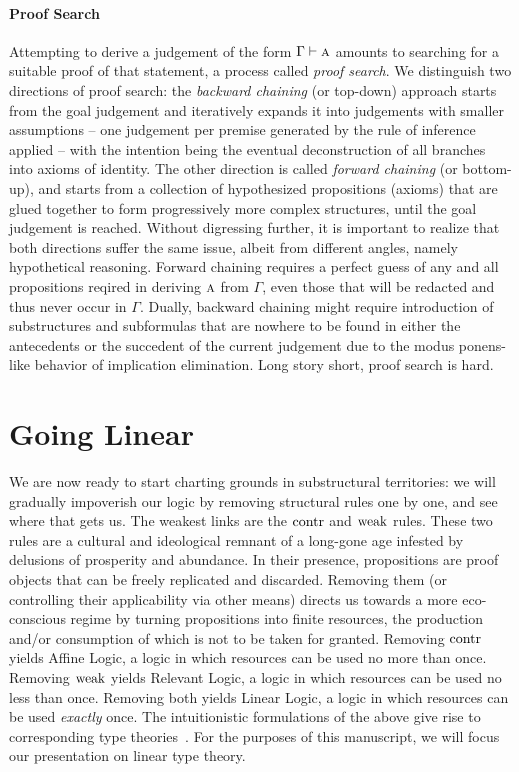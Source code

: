 \paragraph{Proof Search}
Attempting to derive a judgement of the form $\Gamma \vdash \smallprop{A}$ amounts to searching for a suitable proof of that statement, a process called \textit{proof search}.
We distinguish two directions of proof search: the \textit{backward chaining} (or top-down) approach starts from the goal judgement and iteratively expands it into judgements with smaller assumptions -- one judgement per premise generated by the rule of inference applied -- with the intention being the eventual deconstruction of all branches into axioms of identity.
The other direction is called \textit{forward chaining} (or bottom-up), and starts from a collection of hypothesized propositions (axioms) that are glued together to form progressively more complex structures, until the goal judgement is reached.
Without digressing further, it is important to realize that both directions suffer the same issue, albeit from different angles, namely hypothetical reasoning.
Forward chaining requires a perfect guess of any and all propositions reqired in deriving $\smallprop{A}$ from $\Gamma$, even those that will be redacted and thus never occur in $\Gamma$.
Dually, backward chaining might require introduction of substructures and subformulas that are nowhere to be found in either the antecedents or the succedent of the current judgement due to the modus ponens-like behavior of implication elimination.
Long story short, proof search is hard.

\section{Going Linear}
We are now ready to start charting grounds in substructural territories: we will gradually impoverish our logic by removing structural rules one by one, and see where that gets us. 
The weakest links are the $\mathrm{contr}{}$ and $\mathrm{weak}{}$ rules.
These two rules are a cultural and ideological remnant of a long-gone age infested by delusions of prosperity and abundance.
In their presence, propositions are proof objects that can be freely replicated and discarded.
Removing them (or controlling their applicability via other means) directs us towards a more eco-conscious regime by turning propositions into finite resources, the production and/or consumption of which is not to be taken for granted.
Removing $\mathrm{contr}{}$ yields Affine Logic, a logic in which resources can be used no more than once.
Removing $\mathrm{weak}{}$ yields Relevant Logic, a logic in which resources can be used no less than once.
Removing both yields Linear Logic, a logic in which resources can be used \textit{exactly} once.
The intuitionistic formulations of the above give rise to corresponding type theories~\cite{pierce2004advanced}.
For the purposes of this manuscript, we will focus our presentation on linear type theory.

